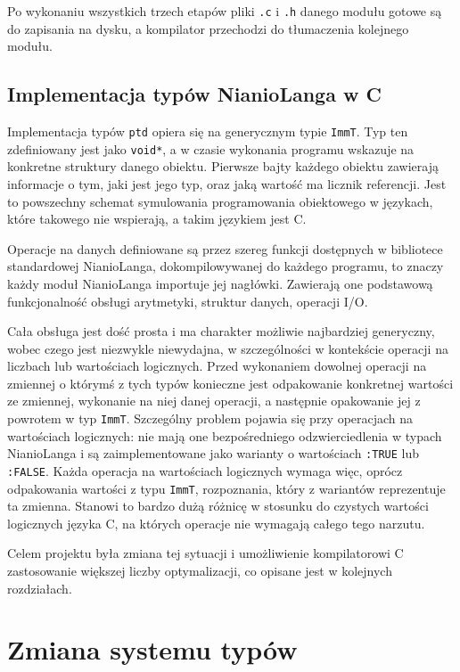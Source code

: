 \documentclass[licencjacka]{pracamgr}
\begin{document}
Po wykonaniu wszystkich trzech etapów pliki \texttt{.c} i \texttt{.h} danego modułu gotowe są do zapisania na dysku, a kompilator przechodzi do
tłumaczenia kolejnego modułu.
\section{Implementacja typów NianioLanga w C}
\label{sec:c_types_implementation}
Implementacja typów \texttt{ptd} opiera się na generycznym typie \texttt{ImmT}. Typ ten zdefiniowany jest jako \texttt{void*}, a w czasie wykonania
programu wskazuje na konkretne struktury danego obiektu. Pierwsze bajty każdego obiektu zawierają informacje o tym, jaki jest jego typ, oraz jaką
wartość ma licznik referencji. Jest to powszechny schemat symulowania programowania obiektowego w językach, które takowego nie wspierają, a takim
językiem jest C.

Operacje na danych definiowane są przez szereg funkcji dostępnych w bibliotece standardowej NianioLanga, dokompilowywanej do każdego programu, to
znaczy każdy moduł NianioLanga importuje jej nagłówki. Zawierają one podstawową funkcjonalność obsługi arytmetyki, struktur danych, operacji I/O.

Cała obsługa jest dość prosta i ma charakter możliwie najbardziej generyczny, wobec czego jest niezwykle niewydajna, w szczególności w kontekście
operacji na liczbach lub wartościach logicznych.
Przed wykonaniem dowolnej operacji na zmiennej o którymś z tych typów konieczne jest odpakowanie konkretnej wartości
ze zmiennej, wykonanie na niej danej operacji, a następnie opakowanie jej z powrotem w typ \texttt{ImmT}.
Szczególny problem pojawia się przy operacjach na wartościach logicznych: nie mają one bezpośredniego odzwierciedlenia
w typach NianioLanga i są zaimplementowane jako warianty o wartościach \texttt{:TRUE} lub \texttt{:FALSE}.
Każda operacja na wartościach logicznych wymaga więc, oprócz odpakowania wartości z typu \texttt{ImmT}, rozpoznania,
który z wariantów reprezentuje ta zmienna.
Stanowi to bardzo dużą różnicę w stosunku do czystych wartości logicznych języka C, na których operacje nie wymagają
całego tego narzutu.


Celem projektu była zmiana tej sytuacji i umożliwienie kompilatorowi C zastosowanie większej liczby
optymalizacji, co opisane jest w kolejnych rozdziałach.


\chapter{Zmiana systemu typów}
\end{document}
